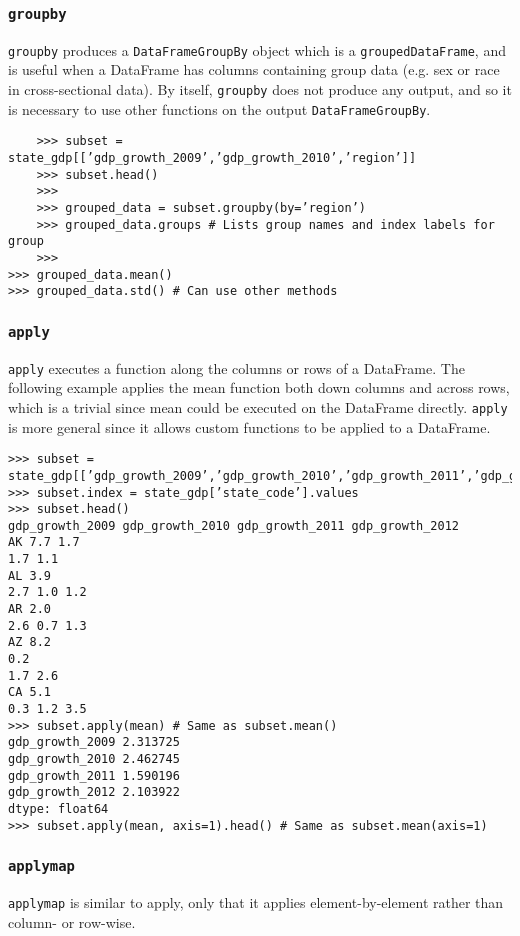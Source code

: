 \documentclass[KSmain.tex]{subfiles}
\begin{document}
\subsubsection*{\texttt{groupby}}
	\texttt{groupby} produces a \texttt{DataFrameGroupBy} object which is a \texttt{groupedDataFrame}, and is useful when a DataFrame
	has columns containing group data (e.g. sex or race in cross-sectional data). By itself, \texttt{groupby} does not
	produce any output, and so it is necessary to use other functions on the output \texttt{DataFrameGroupBy}.
	\begin{framed}
	\begin{verbatim}
	>>> subset = state_gdp[[’gdp_growth_2009’,’gdp_growth_2010’,’region’]]
	>>> subset.head()
	>>>
	>>> grouped_data = subset.groupby(by=’region’)
	>>> grouped_data.groups # Lists group names and index labels for group
	>>>
>>> grouped_data.mean()
>>> grouped_data.std() # Can use other methods

\end{verbatim}
\end{framed}
\subsubsection*{\texttt{apply}}
\texttt{apply} executes a function along the columns or rows of a DataFrame. The following example applies the
mean function both down columns and across rows, which is a trivial since mean could be executed on the
DataFrame directly. \texttt{apply} is more general since it allows custom functions to be applied to a DataFrame.

\begin{framed}
\begin{verbatim}
>>> subset = state_gdp[[’gdp_growth_2009’,’gdp_growth_2010’,’gdp_growth_2011’,’gdp_growth_2012’]]
>>> subset.index = state_gdp[’state_code’].values
>>> subset.head()
gdp_growth_2009 gdp_growth_2010 gdp_growth_2011 gdp_growth_2012
AK 7.7 1.7
1.7 1.1
AL 3.9
2.7 1.0 1.2
AR 2.0
2.6 0.7 1.3
AZ 8.2
0.2
1.7 2.6
CA 5.1
0.3 1.2 3.5
>>> subset.apply(mean) # Same as subset.mean()
gdp_growth_2009 2.313725
gdp_growth_2010 2.462745
gdp_growth_2011 1.590196
gdp_growth_2012 2.103922
dtype: float64
>>> subset.apply(mean, axis=1).head() # Same as subset.mean(axis=1)
\end{verbatim}
\end{framed}
\subsubsection*{\texttt{applymap}}
\texttt{applymap} is similar to apply, only that it applies element-by-element rather than column- or row-wise.
\end{document}
